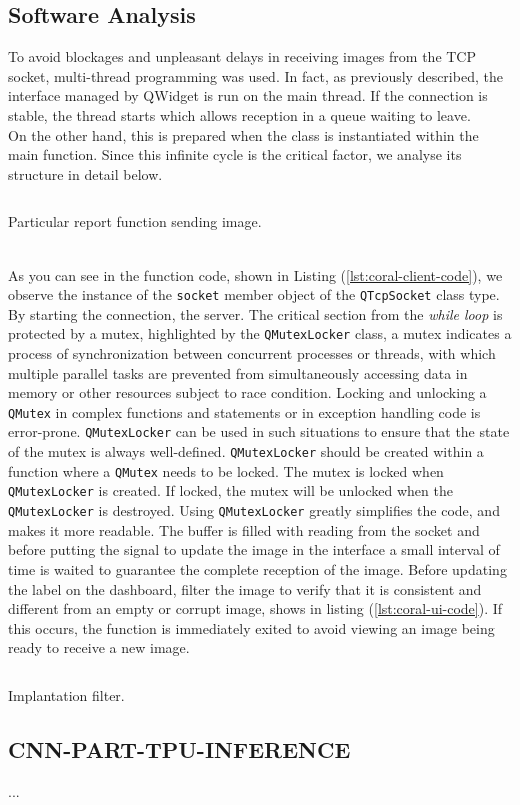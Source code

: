 \subsection{Software Analysis}
\label{ssec:software-coral-analysis}
To avoid blockages and unpleasant delays in receiving images from the TCP
socket, multi-thread programming was used. In fact, as previously described, the
interface managed by QWidget is run on the main thread. If the connection is
stable, the thread starts which allows reception in a queue waiting to leave.\\ 
On the other hand, this is prepared when the class is instantiated within the
main function. Since this infinite cycle is the critical factor, we analyse its
structure in detail below.
%
\begin{listing}[ht] 
\inputminted[frame=lines,framesep=2mm, linenos=true, autogobble, breaklines=true, fontsize=\scriptsize, firstline=12, lastline=26]{c++}{software/code/streamerthread.cpp} 
\caption{Particular report function sending image.} 
\label{lst:coral-client-code} 
\end{listing}
%
\\As you can see in the function code, shown in Listing
(\ref{lst:coral-client-code}), we observe the instance of the \texttt{socket}
member object of the \texttt{QTcpSocket} class type. 
By starting the connection, the server. 
The critical section from the \emph{while loop} is protected by a mutex,
highlighted by the \texttt{QMutexLocker} class, a mutex indicates a
process of synchronization between concurrent processes or threads, with which
multiple parallel tasks are prevented from simultaneously accessing 
data in memory or other resources subject to race condition.\cite{wiki:mutex} 
Locking and unlocking a \texttt{QMutex} in complex functions and statements or
in exception handling code is error-prone.
\texttt{QMutexLocker} can be used in such situations to ensure that the state of the
mutex is always well-defined. \texttt{QMutexLocker} should be created within a
function where a \texttt{QMutex} needs to be locked. The mutex is locked when
\texttt{QMutexLocker} is created. If locked, the mutex will be unlocked when
the \texttt{QMutexLocker} is destroyed.
Using \texttt{QMutexLocker} greatly simplifies the code, and makes it more
readable.\cite{Qt:QMutexclass}
The buffer is filled with reading from the socket and before putting the signal
to update the image in the interface a small interval of time is waited to
guarantee the complete reception of the image.
Before updating the label on the dashboard, filter the image to verify that it
is consistent and different from an empty or corrupt image, shows in listing
(\ref{lst:coral-ui-code}). 
If this occurs, the function is immediately exited to
avoid viewing an image being ready to receive a new image. 
%
\begin{listing}[ht] 
\inputminted[frame=lines,framesep=2mm, linenos=true, autogobble, breaklines=true, fontsize=\scriptsize, firstline=88, lastline=100]{c++}{software/code/tcpclient.cpp} 
\caption{Implantation filter.} 
\label{lst:coral-ui-code} 
\end{listing}
%
\subsection{CNN-PART-TPU-INFERENCE}
...
